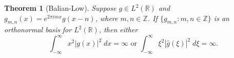 \documentclass[12pt]{article}
\newtheorem{thm}{Theorem}
\newcommand{\R}{\mathbb{R}}
\newcommand{\Z}{\mathbb{Z}}
\begin{document}
\begin{thm}[Balian-Low]
Suppose $g \in L^2(\R)$ and $g_{m,n}(x) = e^{2\pi i m x} g(x - n)$, where $m,n \in \Z$.
If $\{g_{m,n}: m, n \in \Z\}$ is an orthonormal basis for $L^2(\R)$, then either
$$\int_{-\infty}^\infty x^2 |g(x)|^2\; dx = \infty \text{ or } \int_{-\infty}^\infty \xi^2|\hat{g}(\xi)|^2\; d\xi = \infty. $$
\end{thm}
\end{document}
